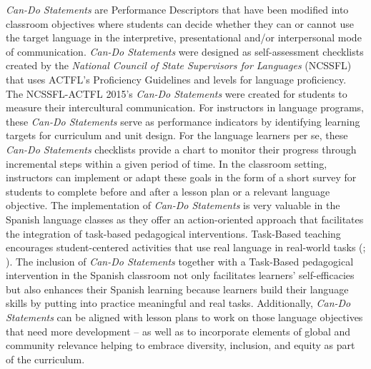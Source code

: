 \documentclass[output=paper]{langscibook}
\begin{document}
\textit{Can-Do Statements} are Performance Descriptors that have been modified into classroom objectives where students can decide whether they can or cannot use the target language in the interpretive, presentational and/or interpersonal mode of communication. \textit{Can-Do Statements} were designed as self-assessment checklists created by the \textit{National Council of State Supervisors for Languages} (NCSSFL) that uses ACTFL’s Proficiency Guidelines and levels for language proficiency. The NCSSFL-ACTFL 2015’s \textit{Can-Do Statements} \citep{MoellerYu2015} were created for students to measure their intercultural communication. For instructors in language programs, these \textit{Can-Do Statements} serve as performance indicators by identifying learning targets for curriculum and unit design. For the language learners per se, these \textit{Can-Do Statements} checklists provide a chart to monitor their progress through incremental steps within a given period of time. In the classroom setting, instructors can implement or adapt these goals in the form of a short survey for students to complete before and after a lesson plan or a relevant language objective. The implementation of \textit{Can-Do Statements} is very valuable in the Spanish language classes as they offer an action-oriented approach that facilitates the integration of task-based pedagogical interventions. Task-Based teaching encourages student-centered activities that use real language in real-world tasks (\citealt{Long1985}; \citealt{Norris2009}). The inclusion of \textit{Can-Do Statements} together with a Task-Based pedagogical intervention in the Spanish classroom not only facilitates learners’ self-efficacies but also enhances their Spanish learning because learners build their language skills by putting into practice meaningful and real tasks. Additionally, \textit{Can-Do Statements} can be aligned with lesson plans to work on those language objectives that need more development -- as well as to incorporate elements of global and community relevance helping to embrace diversity, inclusion, and equity as part of the curriculum.
\end{document}
